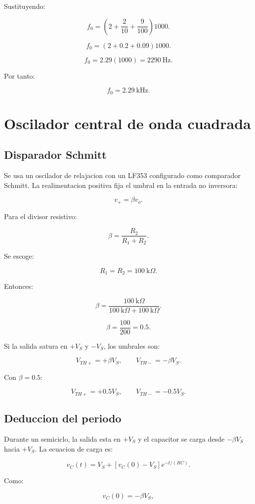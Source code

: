 \documentclass[11pt,letterpaper]{article}
\begin{document}
Sustituyendo:

\[
f_0=
\left(
2+\frac{2}{10}+\frac{9}{100}
\right)1000.
\]

\[
f_0=
\left(
2+0.2+0.09
\right)1000.
\]

\[
f_0=2.29(1000)=2290~\text{Hz}.
\]

Por tanto:

\[
\boxed{f_0=2.29~\text{kHz}}.
\]

\section{Oscilador central de onda cuadrada}

\subsection{Disparador Schmitt}

Se usa un oscilador de relajacion con un LF353 configurado como comparador
Schmitt. La realimentacion positiva fija el umbral en la entrada no inversora:

\[
v_+=\beta v_o.
\]

Para el divisor resistivo:

\[
\beta=\frac{R_2}{R_1+R_2}.
\]

Se escoge:

\[
R_1=R_2=100~\text{k}\Omega.
\]

Entonces:

\[
\beta=
\frac{100~\text{k}\Omega}
{100~\text{k}\Omega+100~\text{k}\Omega}.
\]

\[
\beta=\frac{100}{200}=0.5.
\]

Si la salida satura en \(+V_S\) y \(-V_S\), los umbrales son:

\[
V_{TH+}=+\beta V_S,
\qquad
V_{TH-}=-\beta V_S.
\]

Con \(\beta=0.5\):

\[
V_{TH+}=+0.5V_S,
\qquad
V_{TH-}=-0.5V_S.
\]

\subsection{Deduccion del periodo}

Durante un semiciclo, la salida esta en \(+V_S\) y el capacitor se carga desde
\(-\beta V_S\) hacia \(+V_S\). La ecuacion de carga es:

\[
v_C(t)=V_S+\left[v_C(0)-V_S\right]e^{-t/(RC)}.
\]

Como:

\[
v_C(0)=-\beta V_S,
\]
\end{document}

